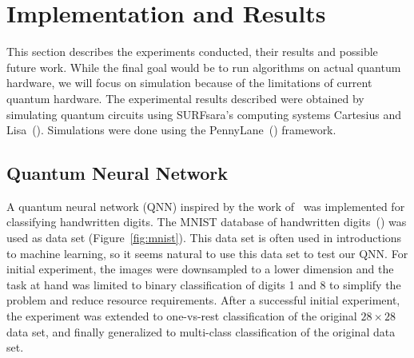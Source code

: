 \documentclass[a4paper,10pt]{article}
\begin{document}
\section{Implementation and Results} \label{sec:implementation-and-results}
This section describes the experiments conducted, their results and possible future work.
While the final goal would be to run algorithms on actual quantum hardware, we will focus on simulation because of the limitations of current quantum hardware.
The experimental results described were obtained by simulating quantum circuits using SURFsara's computing systems Cartesius and Lisa~(\cite{surfsara}).
Simulations were done using the PennyLane~(\cite{bergholm2018pennylane}) framework.

\subsection{Quantum Neural Network}
A quantum neural network (QNN) inspired by the work of~\textcite{qnn-near-term} was implemented for classifying handwritten digits.
The MNIST database of handwritten digits~(\cite{mnist-digits}) was used as data set (Figure~\ref{fig:mnist}).
This data set is often used in introductions to machine learning, so it seems natural to use this data set to test our QNN.
For initial experiment, the images were downsampled to a lower dimension and the task at hand was limited to binary classification of digits 1 and 8 to simplify the problem and reduce resource requirements.
After a successful initial experiment, the experiment was extended to one-vs-rest classification of the original $28 \times 28$ data set, and finally generalized to multi-class classification of the original data set.
\end{document}

